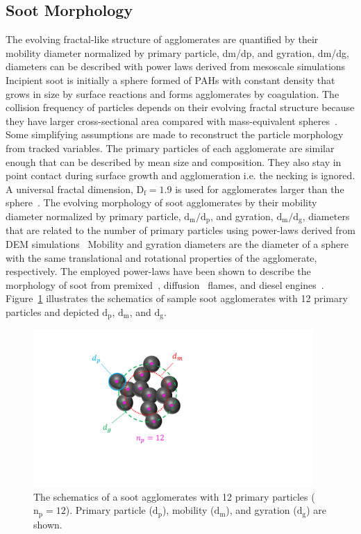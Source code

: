 \subsection{Soot Morphology}
\label{sec:sootmorphology}
The evolving fractal-like structure of agglomerates are quantified by their mobility diameter normalized by primary particle, dm/dp, and gyration, dm/dg, diameters can be described with power laws derived from mesoscale
simulations 
Incipient soot is initially a sphere formed of PAHs with constant density that grows in size by surface reactions and forms agglomerates by coagulation. The collision frequency of particles depends on their evolving fractal structure because they have larger cross-sectional area compared with mass-equivalent spheres~\citep{mulholland1988cluster}. Some simplifying assumptions are made to reconstruct the particle morphology from tracked variables. The primary particles of each agglomerate are similar enough that can be described by mean size and composition. They also stay in point contact during surface growth and agglomeration i.e. the necking is ignored. A universal fractal dimension,
$\mathrm{D_f=1.9}$ is used for agglomerates larger than the sphere~\citep{ball1984finite}.
The evolving morphology of soot agglomerates by their mobility diameter normalized by primary particle, $\mathrm{d_m/d_p}$, and gyration, $\mathrm{d_m/d_g}$, diameters that are related to the number of primary particles using power-laws derived from DEM simulations~\citep{Kelesidis2017} Mobility and gyration diameters are the diameter of a sphere with the same translational and rotational properties of the agglomerate, respectively. The employed power-laws have been shown to describe the morphology of soot from premixed~\citep{abid2008evolution}, diffusion~\citep{yon2015simple} flames, and diesel engines~\citep{rissler2013effective}. Figure~\ref{fig:Morphology} illustrates the schematics of sample soot agglomerates with 12 primary particles and depicted $\mathrm{d_p}$, $\mathrm{d_m}$, and $\mathrm{d_g}$.  
\begin{figure}[!htbp]
	\centering
	\includegraphics[height=60mm, ]{Figures/Morphology.pdf}
	\caption{The schematics of a soot agglomerates with 12 primary particles ($\mathrm{n_p=12}$). Primary particle ($\mathrm{d_p}$), mobility ($\mathrm{d_m}$), and gyration ($\mathrm{d_g}$) are shown.}
	\label{fig:Morphology}
\end{figure} 


